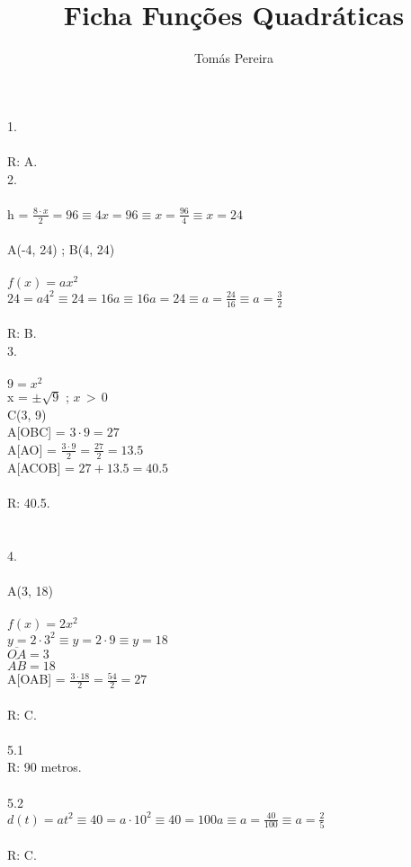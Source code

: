 \documentclass[12pt]{article}
\title{Ficha Funções Quadráticas}
\author{Tomás Pereira}
\begin{document}
\maketitle

1.\\\\
R: A.\\



2.\\\\
h = $\frac{8\cdot x}{2}=96\equiv4x=96\equiv x=\frac{96}{4}\equiv x=24$\\\\
A(-4,  24) ; B(4, 24)\\\\
$f(x)=ax^2$\\
$24=a4^2\equiv24=16a\equiv16a=24\equiv a=\frac{24}{16}\equiv a=\frac{3}{2}$\\\\
R: B.\\

3.\\\\
$9=x^2$\\
x = $\pm\sqrt{9}$ ; $x\,>\,0$\\
C(3, 9)\\
A[OBC] = $3\cdot9=27$\\
A[AO] = $\frac{3\cdot9}{2}=\frac{27}{2}=13.5$\\
A[ACOB] = $27+13.5=40.5$\\\\
R: 40.5.\\\\\\

4.\\\\
A(3, 18)\\\\
$f(x)=2x^2$\\
$y=2\cdot3^2\equiv y =2\cdot9\equiv y=18$\\
$\overline{OA}=3$\\
$\overline{AB}=18$\\
A[OAB] = $\frac{3\cdot18}{2}=\frac{54}{2}=27$\\\\
R: C.\\
\\
5.1\\
R: 90 metros.\\\\
5.2\\
$d(t)=at^2\equiv40=a\cdot10^2\equiv40=100a\equiv a=\frac{40}{100}\equiv a=\frac{2}{5}$\\\\
R: C.\\
\end{document}
